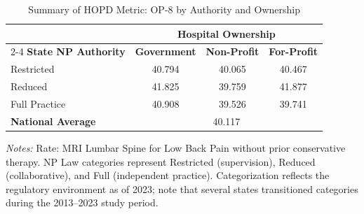 \begin{table}[htbp]
    \centering
    \caption{Summary of HOPD Metric: OP-8 by Authority and Ownership}
    \label{tab:hopd_op_8}
    \vspace{0.2cm}
    \begin{tabular}{lccc}
        \toprule
        & \multicolumn{3}{c}{\textbf{Hospital Ownership}} \\
        \cmidrule(lr){2-4}
        \textbf{State NP Authority} & \textbf{Government} & \textbf{Non-Profit} & \textbf{For-Profit} \\
        \midrule
        Restricted & 40.794 & 40.065 & 40.467 \\
        Reduced & 41.825 & 39.759 & 41.877 \\
        Full Practice & 40.908 & 39.526 & 39.741 \\
        \midrule
        \textbf{National Average} & \multicolumn{3}{c}{40.117} \\
        \bottomrule
    \end{tabular}
    \vspace{0.1cm}
    \begin{minipage}{0.85\textwidth}
        \footnotesize \textit{Notes:} Rate: MRI Lumbar Spine for Low Back Pain without prior conservative therapy. NP Law categories represent Restricted (supervision), Reduced (collaborative), and Full (independent practice). Categorization reflects the regulatory environment as of 2023; note that several states transitioned categories during the 2013--2023 study period.
    \end{minipage}
\end{table}